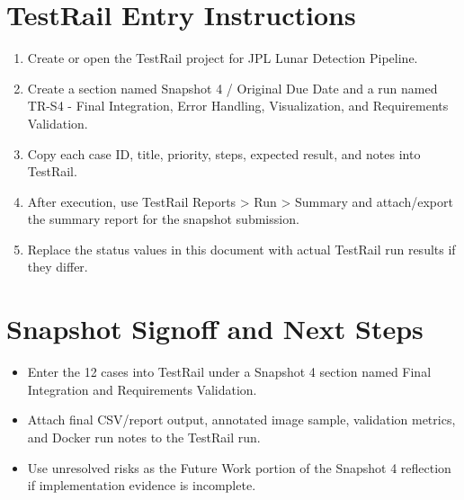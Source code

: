 \documentclass[11pt,landscape]{article}
\begin{document}
\section*{TestRail Entry Instructions}
\begin{enumerate}[leftmargin=*]
\item Create or open the TestRail project for JPL Lunar Detection Pipeline.
\item Create a section named Snapshot 4 / Original Due Date and a run named TR-S4 - Final Integration, Error Handling, Visualization, and Requirements Validation.
\item Copy each case ID, title, priority, steps, expected result, and notes into TestRail.
\item After execution, use TestRail Reports > Run > Summary and attach/export the summary report for the snapshot submission.
\item Replace the status values in this document with actual TestRail run results if they differ.
\end{enumerate}
\section*{Snapshot Signoff and Next Steps}
\begin{itemize}[leftmargin=*]
\item Enter the 12 cases into TestRail under a Snapshot 4 section named Final Integration and Requirements Validation.
\item Attach final CSV/report output, annotated image sample, validation metrics, and Docker run notes to the TestRail run.
\item Use unresolved risks as the Future Work portion of the Snapshot 4 reflection if implementation evidence is incomplete.
\end{itemize}
\end{document}

